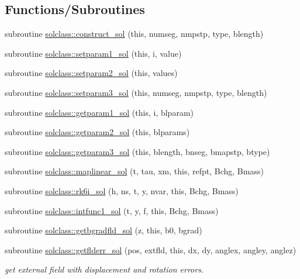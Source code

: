 \subsection*{Functions/\+Subroutines}
\begin{DoxyCompactItemize}
\item 
subroutine \mbox{\hyperlink{namespacesolclass_a2307b36cefac8604240e62757dd08cb9}{solclass\+::construct\+\_\+sol}} (this, numseg, nmpstp, type, blength)
\item 
subroutine \mbox{\hyperlink{namespacesolclass_aaec011d4f25d3b03a7e0b42beaa7c9db}{solclass\+::setparam1\+\_\+sol}} (this, i, value)
\item 
subroutine \mbox{\hyperlink{namespacesolclass_a8f2eac99c954759e1b3b6094d8f502fb}{solclass\+::setparam2\+\_\+sol}} (this, values)
\item 
subroutine \mbox{\hyperlink{namespacesolclass_a05dc05d4a94a2e1a71280ff983e62c3e}{solclass\+::setparam3\+\_\+sol}} (this, numseg, nmpstp, type, blength)
\item 
subroutine \mbox{\hyperlink{namespacesolclass_a68e03415e9802b36da3ec9bae72f41b7}{solclass\+::getparam1\+\_\+sol}} (this, i, blparam)
\item 
subroutine \mbox{\hyperlink{namespacesolclass_aab6c073c4b20670742987b17bcb8366d}{solclass\+::getparam2\+\_\+sol}} (this, blparams)
\item 
subroutine \mbox{\hyperlink{namespacesolclass_a11962a787b8bed31dd906ac4a5e2853e}{solclass\+::getparam3\+\_\+sol}} (this, blength, bnseg, bmapstp, btype)
\item 
subroutine \mbox{\hyperlink{namespacesolclass_ac1f4d73224d7585c1be1bb6f24f125df}{solclass\+::maplinear\+\_\+sol}} (t, tau, xm, this, refpt, Bchg, Bmass)
\item 
subroutine \mbox{\hyperlink{namespacesolclass_ae384372c54c045759b9bb9e1eb0886a1}{solclass\+::rk6i\+\_\+sol}} (h, ns, t, y, nvar, this, Bchg, Bmass)
\item 
subroutine \mbox{\hyperlink{namespacesolclass_a195ad6d94c20d0ac4d6ed1c8063a8a3b}{solclass\+::intfunc1\+\_\+sol}} (t, y, f, this, Bchg, Bmass)
\item 
subroutine \mbox{\hyperlink{namespacesolclass_ad89ee3db004c00d4f2e128ddbf03ce32}{solclass\+::getbgradfld\+\_\+sol}} (z, this, b0, bgrad)
\item 
subroutine \mbox{\hyperlink{namespacesolclass_a571ab7b6c8ce4dd9e7eaa2489b874682}{solclass\+::getflderr\+\_\+sol}} (pos, extfld, this, dx, dy, anglex, angley, anglez)
\begin{DoxyCompactList}\small\item\em get external field with displacement and rotation errors. \end{DoxyCompactList}\item 

\end{DoxyCompactItemize}
